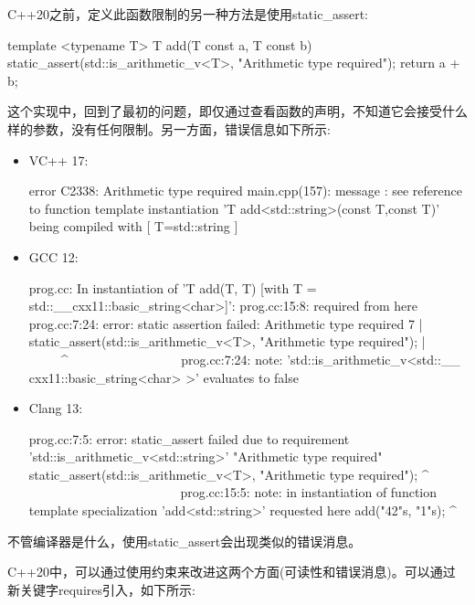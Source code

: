 C++20之前，定义此函数限制的另一种方法是使用static\_assert:

\begin{cpp}
template <typename T>
T add(T const a, T const b)
{
	static_assert(std::is_arithmetic_v<T>,
				  "Arithmetic type required");
	return a + b;
}
\end{cpp}

这个实现中，回到了最初的问题，即仅通过查看函数的声明，不知道它会接受什么样的参数，没有任何限制。另一方面，错误信息如下所示:

\begin{itemize}
\item
VC++ 17:

\begin{shell}
error C2338: Arithmetic type required
main.cpp(157): message : see reference to function
template instantiation 'T add<std::string>(const T,const
T)' being compiled
     with
     [
         T=std::string
     ]
\end{shell}

\item
GCC 12:

\begin{shell}
prog.cc: In instantiation of 'T add(T, T) [with T =
std::__cxx11::basic_string<char>]':
prog.cc:15:8: required from here
prog.cc:7:24: error: static assertion failed: Arithmetic
type required
    7 | static_assert(std::is_arithmetic_v<T>,
"Arithmetic type required");
      |                         ~~~~~^~~~~~~~~~~~~~~~~~
prog.cc:7:24: note: 'std::is_arithmetic_v<std::__
cxx11::basic_string<char> >' evaluates to false
\end{shell}

\item
Clang 13:

\begin{shell}
prog.cc:7:5: error: static_assert failed due to
requirement 'std::is_arithmetic_v<std::string>'
"Arithmetic type required"
     static_assert(std::is_arithmetic_v<T>, "Arithmetic
type required");
     ^ ~~~~~~~~~~~~~~~~~~~~~~~
prog.cc:15:5: note: in instantiation of function template
specialization 'add<std::string>' requested here
    add("42"s, "1"s);
    ^
\end{shell}
\end{itemize}

不管编译器是什么，使用static\_assert会出现类似的错误消息。

C++20中，可以通过使用约束来改进这两个方面(可读性和错误消息)。可以通过新关键字requires引入，如下所示:

